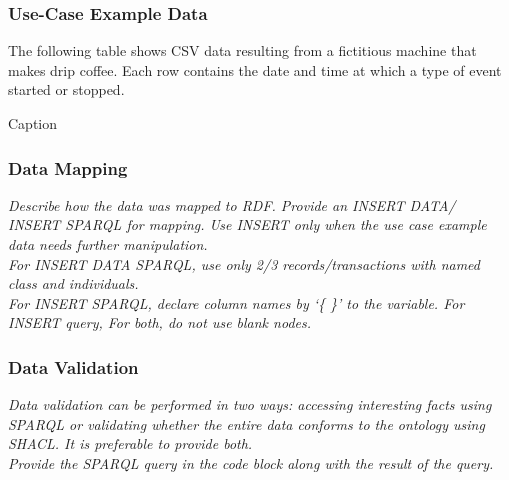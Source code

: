\subsubsection*{Use-Case Example Data}
The following table shows CSV data resulting from a fictitious machine that makes drip coffee. Each row contains the date and time at which a type of event started or stopped.

\begin{table}[]
    \centering
    \caption{Caption}
    \label{tab:my_label}
\end{table}    


\subsubsection*{Data Mapping}
 \textit{ 
Describe how the data was mapped to RDF. Provide an INSERT DATA/ INSERT SPARQL for mapping. Use INSERT only when the use case example data needs further manipulation. \\
For INSERT DATA SPARQL, use only 2/3 records/transactions with named class and individuals. \\
For INSERT SPARQL, declare column names by `\{ \}' to the variable.  
For INSERT query, 
For both, do not use blank nodes.    
  }

\subsubsection*{Data Validation}
 \textit{ 
Data validation can be performed in two ways: accessing interesting facts using SPARQL or validating whether the entire data conforms to the ontology using SHACL. It is preferable to provide both. \\
Provide the SPARQL query in the code block along with the result of the query. \\
  }